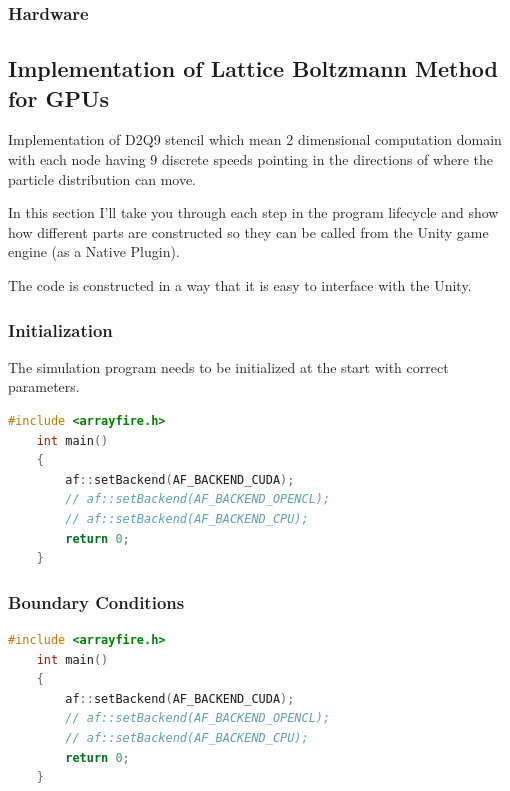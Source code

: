 \subsubsection{Hardware}


\subsection{Implementation of Lattice Boltzmann Method for GPUs}

Implementation of D2Q9 stencil which mean 2 dimensional computation domain with each node having 9 discrete speeds pointing in the directions of where the particle distribution can move.

In this section I'll take you through each step in the program lifecycle and show how different parts are constructed so they can be called from the Unity game engine (as a Native Plugin).

The code is constructed in a way that it is easy to interface with the Unity.

\subsubsection{Initialization}

The simulation program needs to be initialized at the start with correct parameters. 

\begin{lstlisting}[language=Cpp, caption=C++ code for setting different computing backends., label=cpp-backends]
	#include <arrayfire.h>
	int main()
	{
		af::setBackend(AF_BACKEND_CUDA);
		// af::setBackend(AF_BACKEND_OPENCL);
		// af::setBackend(AF_BACKEND_CPU);
		return 0;
	}
\end{lstlisting}


\subsubsection{Boundary Conditions}

\begin{lstlisting}[language=Cpp, caption=C++ code for setting different computing backends., label=cpp-backends]
	#include <arrayfire.h>
	int main()
	{
		af::setBackend(AF_BACKEND_CUDA);
		// af::setBackend(AF_BACKEND_OPENCL);
		// af::setBackend(AF_BACKEND_CPU);
		return 0;
	}
\end{lstlisting}

